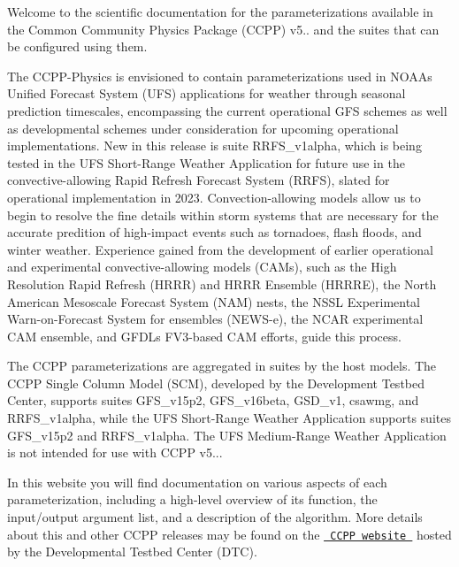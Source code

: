 Welcome to the scientific documentation for the parameterizations available in the Common Community Physics Package (CCPP) v5.. and the suites that can be configured using them.



The CCPP-\/\+Physics is envisioned to contain parameterizations used in NOAA\textquotesingle{}s Unified Forecast System (UFS) applications for weather through seasonal prediction timescales, encompassing the current operational GFS schemes as well as developmental schemes under consideration for upcoming operational implementations. New in this release is suite RRFS\+\_\+v1alpha, which is being tested in the UFS Short-\/\+Range Weather Application for future use in the convective-\/allowing Rapid Refresh Forecast System (RRFS), slated for operational implementation in 2023. Convection-\/allowing models allow us to begin to resolve the fine details within storm systems that are necessary for the accurate predition of high-\/impact events such as tornadoes, flash floods, and winter weather. Experience gained from the development of earlier operational and experimental convective-\/allowing models (CAMs), such as the High Resolution Rapid Refresh (HRRR) and HRRR Ensemble (HRRRE), the North American Mesoscale Forecast System (NAM) nests, the NSSL Experimental Warn-\/on-\/\+Forecast System for ensembles (NEWS-\/e), the NCAR experimental CAM ensemble, and GFDL\textquotesingle{}s FV3-\/based CAM efforts, guide this process.

The CCPP parameterizations are aggregated in suites by the host models. The CCPP Single Column Model (SCM), developed by the Development Testbed Center, supports suites GFS\+\_\+v15p2, GFS\+\_\+v16beta, GSD\+\_\+v1, csawmg, and RRFS\+\_\+v1alpha, while the UFS Short-\/\+Range Weather Application supports suites GFS\+\_\+v15p2 and RRFS\+\_\+v1alpha. The UFS Medium-\/\+Range Weather Application is not intended for use with CCPP v5... ~\newline


In this website you will find documentation on various aspects of each parameterization, including a high-\/level overview of its function, the input/output argument list, and a description of the algorithm. More details about this and other CCPP releases may be found on the \href{https://dtcenter.org/community-code/common-community-physics-package-ccpp}{\texttt{ CCPP website }} hosted by the Developmental Testbed Center (DTC). 